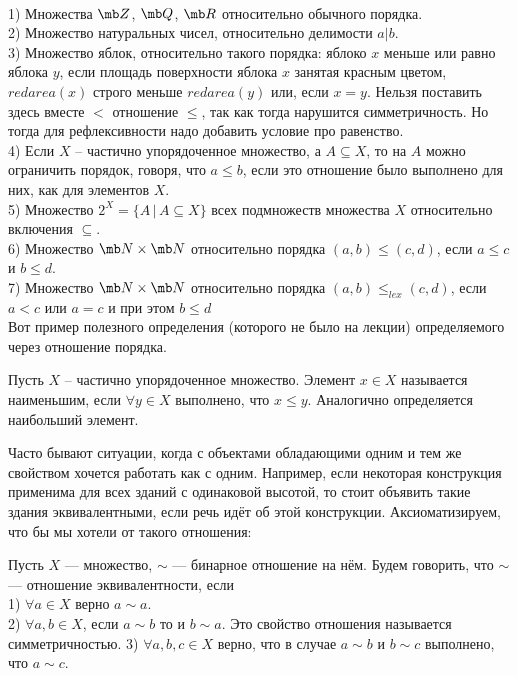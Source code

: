 \exm \\
1) Множества $\mb Z$, $\mb Q$, $\mb R$ относительно обычного порядка.\\
2) Множество натуральных чисел, относительно делимости $a | b$.\\
3) Множество яблок, относительно такого порядка: яблоко $x$ меньше или равно яблока $y$, если площадь поверхности яблока $x$ занятая красным цветом, $redarea(x)$ строго меньше $redarea(y)$ или, если  $x=y$. Нельзя поставить здесь вместе $<$ отношение $\leq$, так как тогда нарушится симметричность. Но тогда для рефлексивности надо добавить условие про равенство.\\
4) Если $X$ -- частично упорядоченное множество, а $A \subseteq X$, то на $A$ можно ограничить порядок, говоря, что $a\leq b$, если это отношение было выполнено для них, как для элементов $X$.\\
5) Множество $2^X=\{A\,|\, A \subseteq X\}$ всех подмножеств множества $X$ относительно включения $\subseteq$.\\
6) Множество $\mb N \times \mb N$ относительно порядка $(a,b) \leq (c,d)$, если $a\leq c$ и $b\leq d$.\\
7) Множество $\mb N \times \mb N$ относительно порядка $(a,b) \leq_{lex} (c,d)$, если $a<c$ или $a=c$ и при этом $b\leq d$\\



Вот пример полезного определения (которого не было на лекции) определяемого через отношение порядка.


 Пусть $X$ -- частично упорядоченное множество. Элемент $x\in X$ называется наименьшим, если $\forall y \in X$  выполнено, что $x\leq y$. Аналогично определяется наибольший  элемент.
\edfn









Часто бывают ситуации, когда с объектами обладающими одним и тем же свойством хочется работать как с одним. Например, если некоторая конструкция применима для всех зданий с одинаковой высотой, то стоит объявить такие здания эквивалентными, если речь идёт об этой конструкции. Аксиоматизируем, что бы мы хотели от такого отношения:

\dfn Пусть $X$ --- множество, $\sim$ --- бинарное отношение на нём. Будем говорить, что $\sim$ --- отношение эквивалентности, если\\
1) $\forall a \in X$ верно $a \sim a$.\\
2) $\forall a,b \in X$, если $a\sim b$ то и $b \sim a$. Это свойство отношения называется симметричностью.
3)  $\forall a,b,c \in X$ верно, что в случае $a \sim b $ и $b \sim c$ выполнено, что $a \sim c$.
\edfn




